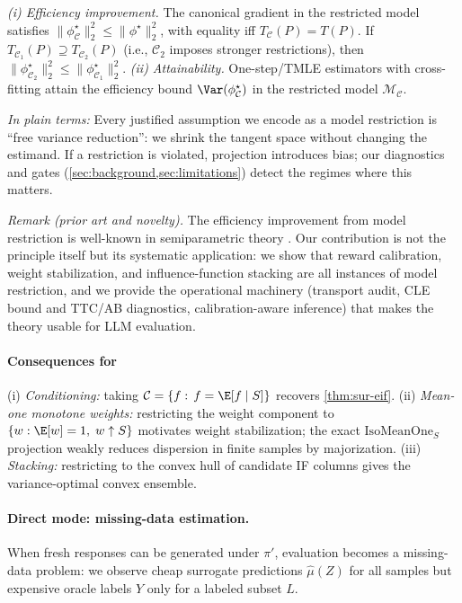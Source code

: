 \begin{theorem}
\label{thm:knowledge-riesz}%
\label{thm:ckp}%
\label{thm:model-restriction}%
\emph{(i) Efficiency improvement.}
The canonical gradient in the restricted model satisfies
$\|\phi^\star_\mathcal{C}\|_2^2 \le \|\phi^\star\|_2^2$, with equality iff $T_\mathcal{C}(P) = T(P)$.
If $T_{\mathcal{C}_1}(P) \supseteq T_{\mathcal{C}_2}(P)$ (i.e., $\mathcal{C}_2$ imposes stronger restrictions), then $\|\phi^\star_{\mathcal{C}_2}\|_2^2\le \|\phi^\star_{\mathcal{C}_1}\|_2^2$.
\emph{(ii) Attainability.} One-step/TMLE estimators with cross-fitting attain the efficiency bound
$\Var(\phi^\star_\mathcal{C})$ in the restricted model $\mathcal{M}_\mathcal{C}$.
\end{theorem}

\noindent\emph{In plain terms:} Every justified assumption we encode as a model restriction is ``free variance reduction'': we shrink the tangent space without changing the estimand.
If a restriction is violated, projection introduces bias; our diagnostics and gates (\cref{sec:background,sec:limitations}) detect the regimes where this matters.

\noindent\emph{Remark (prior art and novelty).} The efficiency improvement from model restriction is well-known in semiparametric theory \citep{Newey1990Semiparametric,Bickel1993}. Our contribution is not the principle itself but its systematic application: we show that reward calibration, weight stabilization, and influence-function stacking are all instances of model restriction, and we provide the operational machinery (transport audit, CLE bound and TTC/AB diagnostics, calibration-aware inference) that makes the theory usable for LLM evaluation.

\paragraph{Consequences for \CJE}
(i) \emph{Conditioning:} taking $\mathcal{C}=\{f:\,f=\E[f\mid S]\}$ recovers \cref{thm:sur-eif}.
(ii) \emph{Mean-one monotone weights:} restricting the weight component to
$\{w:\E[w]=1,\; w\uparrow S\}$ motivates weight stabilization; the exact $\mathrm{IsoMeanOne}_S$ projection weakly reduces dispersion in finite samples by majorization.
(iii) \emph{Stacking:} restricting to the convex hull of candidate IF columns gives the
variance-optimal convex ensemble.

\paragraph{Direct mode: missing-data estimation.}
When fresh responses can be generated under $\pi'$, evaluation becomes a missing-data problem: we observe cheap surrogate predictions $\hat\mu(Z)$ for all samples but expensive oracle labels $Y$ only for a labeled subset $L$.

